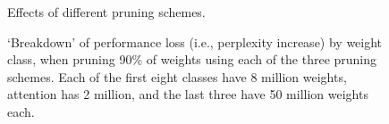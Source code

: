 \begin{figure}
\centering

\caption{Effects of different pruning schemes.}
\label{fig:pruning_methods}
\end{figure}

\begin{figure}
\centering

\caption[`Breakdown' of performance loss]{`Breakdown' of performance loss (i.e., perplexity increase) by weight class, when pruning 90\% of weights using each of the three pruning schemes. Each of the first eight classes have 8 million weights, attention has 2 million, and the last three have 50 million weights each.}
\label{fig:breakdown}
\end{figure}


